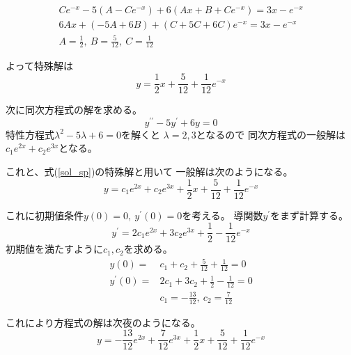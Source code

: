 \documentclass[12pt,b5paper]{ltjsarticle}
\begin{document}
\begin{enumerate}
      \begin{gather}
       Ce^{-x} -5(A-Ce^{-x}) +6(Ax+B+Ce^{-x}) = 3x-e^{-x}\\
       6Ax + (-5A+6B) +(C+5C+6C)e^{-x} = 3x-e^{-x}\\
       A=\frac{1}{2}, \ B= \frac{5}{12}, \ C=\frac{1}{12}
      \end{gather}

      よって特殊解は
      \begin{equation}
       y=\frac{1}{2}x + \frac{5}{12} + \frac{1}{12}e^{-x}
        \label{sol_sp}
      \end{equation}

      次に同次方程式の解を求める。
      \begin{equation}
       y^{\prime\prime} -5 y^{\prime} + 6y=0
      \end{equation}
      特性方程式$\lambda^2 -5\lambda +6=0$を解くと
      $\lambda=2,3$となるので
      同次方程式の一般解は$c_1e^{2x}+c_2e^{3x}$となる。

      これと、式(\ref{sol_sp})の特殊解と用いて
      一般解は次のようになる。
      \begin{equation}
       y=c_1e^{2x}+c_2e^{3x} + \frac{1}{2}x + \frac{5}{12} + \frac{1}{12}e^{-x}
      \end{equation}

      これに初期値条件$y(0)=0,\ y^{\prime}(0)=0$を考える。
      導関数$y^{\prime}$をまず計算する。
      \begin{equation}
       y^{\prime}
        =2c_1e^{2x}+3c_2e^{3x} + \frac{1}{2} - \frac{1}{12}e^{-x}
      \end{equation}
      初期値を満たすように$c_1,c_2$を求める。
      \begin{align}
       y(0) =& c_1 + c_2 + \frac{5}{12} + \frac{1}{12} =0\\
       y^{\prime}(0) =& 2c_1 + 3c_2 + \frac{1}{2} - \frac{1}{12} =0\\
       & c_1=-\frac{13}{12}, \ c_2=\frac{7}{12}
      \end{align}

      これにより方程式の解は次夜のようになる。
      \begin{equation}
       y= -\frac{13}{12}e^{2x}+ \frac{7}{12}e^{3x} + \frac{1}{2}x + \frac{5}{12} + \frac{1}{12}e^{-x}
      \end{equation}

\end{enumerate}


\hrulefill
\end{document}

